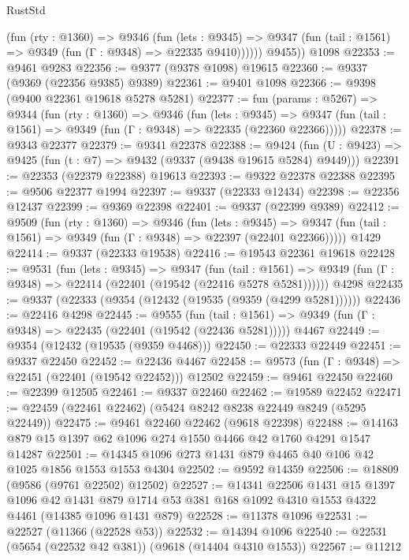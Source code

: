 \begin{lexlean}{RustStd}
\begin{coremodule}
            (fun (rty : @1360) =>
            @9346
              (fun (lets : @9345) =>
              @9347 (fun (tail : @1561) => @9349 (fun (Γ : @9348) => @22335 @9410))))))
        @9455))
    @1098
@22353 := @9461 @9283
@22356 := @9377 (@9378 @1098) @19615
@22360 := @9337 (@9369 (@22356 @9385) @9389)
@22361 := @9401 @1098
@22366 := @9398 (@9400 @22361 @19618 @5278 @5281)
@22377 := fun (params : @5267) =>
  @9344
    (fun (rty : @1360) =>
    @9346
      (fun (lets : @9345) =>
      @9347 (fun (tail : @1561) => @9349 (fun (Γ : @9348) => @22335 (@22360 @22366)))))
@22378 := @9343 @22377
@22379 := @9341 @22378
@22388 := @9424
    (fun (U : @9423) => @9425 (fun (t : @7) => @9432 (@9337 (@9438 @19615 @5284) @9449)))
@22391 := @22353 (@22379 @22388) @19613
@22393 := @9322 @22378 @22388
@22395 := @9506 @22377 @1994
@22397 := @9337 (@22333 @12434)
@22398 := @22356 @12437
@22399 := @9369 @22398
@22401 := @9337 (@22399 @9389)
@22412 := @9509
    (fun (rty : @1360) =>
    @9346
      (fun (lets : @9345) =>
      @9347 (fun (tail : @1561) => @9349 (fun (Γ : @9348) => @22397 (@22401 @22366)))))
    @1429
@22414 := @9337 (@22333 @19538)
@22416 := @19543 @22361 @19618
@22428 := @9531
    (fun (lets : @9345) =>
    @9347
      (fun (tail : @1561) =>
      @9349 (fun (Γ : @9348) => @22414 (@22401 (@19542 (@22416 @5278 @5281))))))
    @4298
@22435 := @9337 (@22333 (@9354 (@12432 (@19535 (@9359 (@4299 @5281))))))
@22436 := @22416 @4298
@22445 := @9555
    (fun (tail : @1561) => @9349 (fun (Γ : @9348) => @22435 (@22401 (@19542 (@22436 @5281)))))
    @4467
@22449 := @9354 (@12432 (@19535 (@9359 @4468)))
@22450 := @22333 @22449
@22451 := @9337 @22450
@22452 := @22436 @4467
@22458 := @9573 (fun (Γ : @9348) => @22451 (@22401 (@19542 @22452))) @12502
@22459 := @9461 @22450
@22460 := @22399 @12505
@22461 := @9337 @22460
@22462 := @19589 @22452
@22471 := @22459 (@22461 @22462) (@5424 @8242 @8238 @22449 @8249 (@5295 @22449))
@22475 := @9461 @22460 @22462 (@9618 @22398)
@22488 := @14163 @879 @15 @1397 @62 @1096 @274 @1550 @4466 @42 @1760 @4291 @1547 @14287
@22501 := @14345 @1096 @273 @1431 @879 @4465 @40 @106 @42 @1025 @1856 @1553 @1553 @4304
@22502 := @9592 @14359
@22506 := @18809 (@9586 (@9761 @22502) @12502)
@22527 := @14341
    @22506
    @1431
    @15
    @1397
    @1096
    @42
    @1431
    @879
    @1714
    @53
    @381
    @168
    @1092
    @4310
    @1553
    @4322
    @4461
    (@14385 @1096 @1431 @879)
@22528 := @11378 @1096
@22531 := @22527 (@11366 (@22528 @53))
@22532 := @14394 @1096
@22540 := @22531 (@5654 (@22532 @42 @381)) (@9618 (@14404 @4310 @1553))
@22567 := @11212

\end{coremodule}
\end{lexlean}
